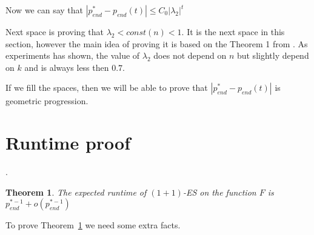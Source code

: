 \documentclass{article}
\newtheorem{theorem}{Theorem}
\begin{document}
Now we can say that $|p_{end}^* - p_{end}(t)| \le C_0 |\lambda_2|^t$

Next space is proving that $\lambda_2 < const(n) < 1.$ It is the next space in this section, however the main idea of proving it is based on the Theorem 1 from \cite{secondev}. As experiments has shown, the value of $\lambda_2$ does not depend on $n$ but slightly depend on $k$ and is always less then $0.7$.

If we fill the spaces, then we will be able to prove that  $|p_{end}^* - p_{end}(t)|$ is geometric progression.

\section{Runtime proof}.

\begin{theorem}\label{runtime_th}
  The expected runtime of $(1 + 1)$-ES on the function $F$ is $p_{end}^{*-1} + o(p_{end}^{*-1})$
\end{theorem}

To prove Theorem~\ref{runtime_th} we need some extra facts.
\end{document}
